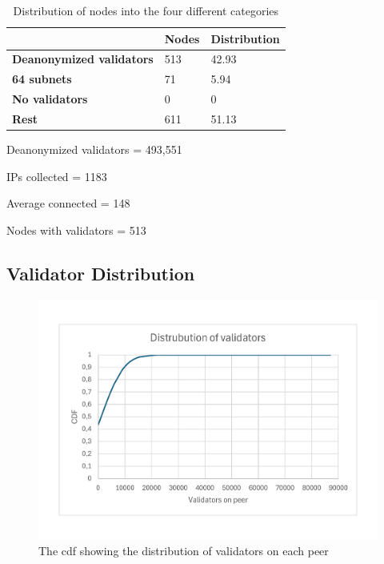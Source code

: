 \begin{table}[]
    \centering
    \caption{Distribution of nodes into the four different categories}
    \begin{tabular}{|l|l|l|}
        \hline
        & \textbf{Nodes} & \textbf{Distribution} \\ \hline
        \textbf{Deanonymized validators} & 513            & 42.93                 \\ \hline
        \textbf{64 subnets}              & 71             & 5.94                  \\ \hline
        \textbf{No validators}           & 0              & 0                     \\ \hline
        \textbf{Rest}                    & 611            & 51.13                 \\ \hline
    \end{tabular}
    \label{tab:distribution}
\end{table}


Deanonymized validators = 493,551

IPs collected = 1183

Average connected = 148

Nodes with validators = 513

\subsection{Validator Distribution}\label{subsec:validator-distribution}
\begin{figure}[!ht]
    \includegraphics[width=\linewidth]{figures/cdf}
    \caption{The cdf showing the distribution of validators on each peer}
    \label{fig:validatorsonpeers}
\end{figure}
